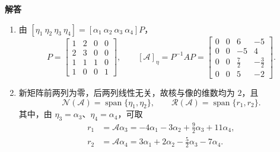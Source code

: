 \documentclass[UTF8,10pt,letterpaper,fontset=fandol]{ctexart}
\newcommand{\Span}{\operatorname{span}}
\newcommand{\Solution}{\par\Needspace{5\baselineskip}\textbf{解答}\par}
\begin{document}
\Solution
\begin{enumerate}
\item 由 \([\eta_1\ \eta_2\ \eta_3\ \eta_4]=[\alpha_1\ \alpha_2\ \alpha_3\ \alpha_4]P\)，
\[
P=\begin{bmatrix}1&2&0&0\\2&3&0&0\\1&1&1&0\\1&0&0&1\end{bmatrix},\qquad
\boxed{[\mathcal A]_{\eta}=P^{-1}AP=
\begin{bmatrix}0&0&6&-5\\0&0&-5&4\\0&0&\tfrac72&-\tfrac32\\0&0&5&-2\end{bmatrix}}.
\]
\item 新矩阵前两列为零，后两列线性无关，故核与像的维数均为 \(2\)，且
\[
\boxed{\mathcal N(\mathcal A)=\Span\{\eta_1,\eta_2\}},\qquad
\boxed{\mathcal R(\mathcal A)=\Span\{r_1,r_2\}}.
\]
其中，由 \(\eta_3=\alpha_3\)、\(\eta_4=\alpha_4\)，可取
\[
\begin{aligned}
r_1&=\mathcal A\alpha_3=-4\alpha_1-3\alpha_2+\tfrac92\alpha_3+11\alpha_4,\\
r_2&=\mathcal A\alpha_4=3\alpha_1+2\alpha_2-\tfrac52\alpha_3-7\alpha_4.
\end{aligned}
\]
\end{enumerate}
\end{document}
